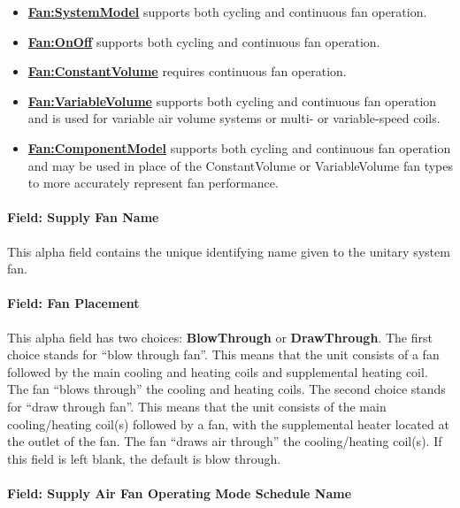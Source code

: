 \begin{itemize}
\item
  \textbf{\hyperref[fansystemmodel]{Fan:SystemModel}} supports both cycling and continuous fan operation.
\item
  \textbf{\hyperref[fanonoff]{Fan:OnOff}} supports both cycling and continuous fan operation.
\item
  \textbf{\hyperref[fanconstantvolume]{Fan:ConstantVolume}} requires continuous fan operation.
\item
  \textbf{\hyperref[fanvariablevolume]{Fan:VariableVolume}} supports both cycling and continuous fan operation and is used for variable air volume systems or multi- or variable-speed coils.
\item
  \textbf{\hyperref[fancomponentmodel]{Fan:ComponentModel}} supports both cycling and continuous fan operation and may be used in place of the ConstantVolume or VariableVolume fan types to more accurately represent fan performance.
\end{itemize}

\paragraph{Field: Supply Fan Name}\label{field-supply-fan-name}

This alpha field contains the unique identifying name given to the unitary system fan.

\paragraph{Field: Fan Placement}\label{field-fan-placement}

This alpha field has two choices: \textbf{BlowThrough} or \textbf{DrawThrough}. The first choice stands for ``blow through fan''. This means that the unit consists of a fan followed by the main cooling and heating coils and supplemental heating coil. The fan ``blows through'' the cooling and heating coils. The second choice stands for ``draw through fan''. This means that the unit consists of the main cooling/heating coil(s) followed by a fan, with the supplemental heater located at the outlet of the fan. The fan ``draws air through'' the cooling/heating coil(s). If this field is left blank, the default is blow through.

\paragraph{Field: Supply Air Fan Operating Mode Schedule Name}\label{supply-air-fan-operating-mode-schedule-name}

